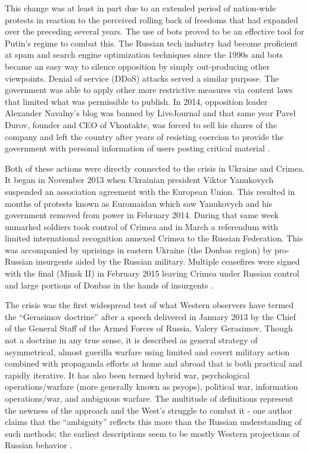 This change was at least in part due to an extended period of nation-wide protests in reaction to the perceived rolling back of freedoms that had expanded over the preceding several years.
The use of bots proved to be an effective tool for Putin's regime to combat this.
The Russian tech industry had become proficient at spam and search engine optimization techniques since the 1990s and bots became an easy way to silence opposition by simply out-producing other viewpoints.
Denial of service (DDoS) attacks served a similar purpose.
The government was able to apply other more restrictive measures via content laws that limited what was permissible to publish.
In 2014, opposition leader Alexander Navalny's blog was banned by LiveJournal and that same year Pavel Durov, founder and CEO of Vkontakte, was forced to sell his shares of the company and left the country after years of resisting coercion to provide the government with personal information of users posting critical material \cite[pp. 29-30]{woolley2018}.

Both of these actions were directly connected to the crisis in Ukraine and Crimea.
It began in November 2013 when Ukrainian president Viktor Yanukovych suspended an association agreement with the European Union.
This resulted in months of protests known as Euromaidan which saw Yanukovych and his government removed from power in February 2014.
During that same week unmarked soldiers took control of Crimea and in March a referendum with limited international recognition annexed Crimea to the Russian Federation.
This was accompanied by uprisings in eastern Ukraine (the Donbas region) by pro-Russian insurgents aided by the Russian military.
Multiple ceasefires were signed with the final (Minsk II) in February 2015 leaving Crimea under Russian control and large portions of Donbas in the hands of insurgents \cite[pp. 44-45]{woolley2018}.

The crisis was the first widespread test of what Western observers have termed the ``Gerasimov doctrine'' after a speech delivered in January 2013 by the Chief of the General Staff of the Armed Forces of Russia, Valery Gerasimov.
Though not a doctrine in any true sense, it is described as general strategy of asymmetrical, almost guerilla warfare using limited and covert military action combined with propaganda efforts at home and abroad that is both practical and rapidly iterative.
It has also been termed hybrid war, psychological operations/warfare (more generally known as psyops), political war, information operations/war, and ambiguous warfare.
The multitude of definitions represent the newness of the approach and the West's struggle to combat it - one author claims that the ``ambiguity'' reflects this more than the Russian understanding of such methods; the earliest descriptions seem to be mostly Western projections of Russian behavior \cite{mcdermott2016}.


